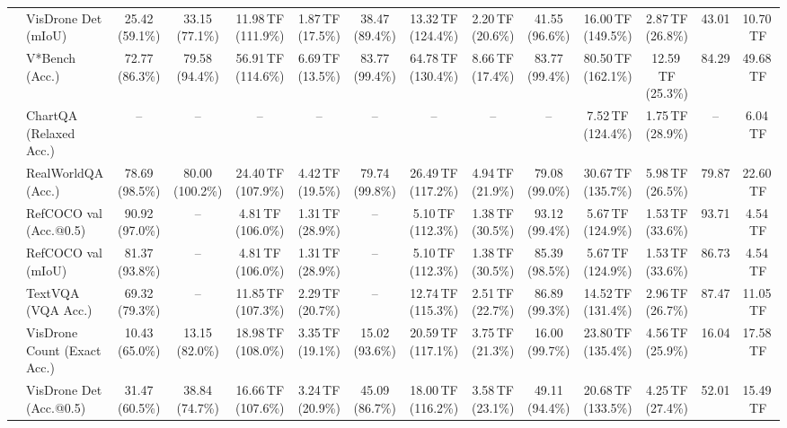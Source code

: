 \begin{table}[t]
\begin{center}
\begin{small}
\begin{sc}
{\begin{tabular}{llcccccccccccc}
& VisDrone Det (mIoU) & 25.42 (59.1\%) & 33.15 (77.1\%) & 11.98\,TF (111.9\%) & 1.87\,TF (17.5\%) & 38.47 (89.4\%) & 13.32\,TF (124.4\%) & 2.20\,TF (20.6\%) & 41.55 (96.6\%) & 16.00\,TF (149.5\%) & 2.87\,TF (26.8\%) & 43.01 & 10.70\,TF \\
& V*Bench (Acc.) & 72.77 (86.3\%) & 79.58 (94.4\%) & 56.91\,TF (114.6\%) & 6.69\,TF (13.5\%) & 83.77 (99.4\%) & 64.78\,TF (130.4\%) & 8.66\,TF (17.4\%) & 83.77 (99.4\%) & 80.50\,TF (162.1\%) & 12.59\,TF (25.3\%) & 84.29 & 49.68\,TF \\
\midrule
{}
& ChartQA (Relaxed Acc.) & -- & -- & -- & -- & -- & -- & -- & -- & 7.52\,TF (124.4\%) & 1.75\,TF (28.9\%) & -- & 6.04\,TF \\
& RealWorldQA (Acc.) & 78.69 (98.5\%) & 80.00 (100.2\%) & 24.40\,TF (107.9\%) & 4.42\,TF (19.5\%) & 79.74 (99.8\%) & 26.49\,TF (117.2\%) & 4.94\,TF (21.9\%) & 79.08 (99.0\%) & 30.67\,TF (135.7\%) & 5.98\,TF (26.5\%) & 79.87 & 22.60\,TF \\
& RefCOCO val (Acc.@0.5) & 90.92 (97.0\%) & -- & 4.81\,TF (106.0\%) & 1.31\,TF (28.9\%) & -- & 5.10\,TF (112.3\%) & 1.38\,TF (30.5\%) & 93.12 (99.4\%) & 5.67\,TF (124.9\%) & 1.53\,TF (33.6\%) & 93.71 & 4.54\,TF \\
& RefCOCO val (mIoU) & 81.37 (93.8\%) & -- & 4.81\,TF (106.0\%) & 1.31\,TF (28.9\%) & -- & 5.10\,TF (112.3\%) & 1.38\,TF (30.5\%) & 85.39 (98.5\%) & 5.67\,TF (124.9\%) & 1.53\,TF (33.6\%) & 86.73 & 4.54\,TF \\
& TextVQA (VQA Acc.) & 69.32 (79.3\%) & -- & 11.85\,TF (107.3\%) & 2.29\,TF (20.7\%) & -- & 12.74\,TF (115.3\%) & 2.51\,TF (22.7\%) & 86.89 (99.3\%) & 14.52\,TF (131.4\%) & 2.96\,TF (26.7\%) & 87.47 & 11.05\,TF \\
& VisDrone Count (Exact Acc.) & 10.43 (65.0\%) & 13.15 (82.0\%) & 18.98\,TF (108.0\%) & 3.35\,TF (19.1\%) & 15.02 (93.6\%) & 20.59\,TF (117.1\%) & 3.75\,TF (21.3\%) & 16.00 (99.7\%) & 23.80\,TF (135.4\%) & 4.56\,TF (25.9\%) & 16.04 & 17.58\,TF \\
& VisDrone Det (Acc.@0.5) & 31.47 (60.5\%) & 38.84 (74.7\%) & 16.66\,TF (107.6\%) & 3.24\,TF (20.9\%) & 45.09 (86.7\%) & 18.00\,TF (116.2\%) & 3.58\,TF (23.1\%) & 49.11 (94.4\%) & 20.68\,TF (133.5\%) & 4.25\,TF (27.4\%) & 52.01 & 15.49\,TF \\

\end{tabular}}
\end{sc}
\end{small}
\end{center}
\end{table}
